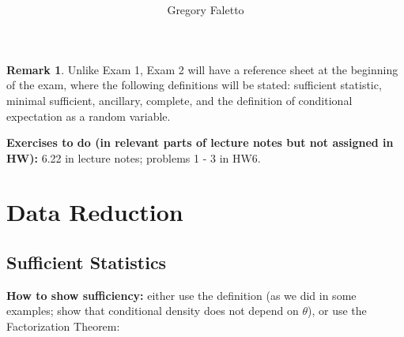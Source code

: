 \documentclass{article}
\title{
    \vspace{2in}
    \textmd{\textbf{ \hmwkTitle}}\\
}
\author{Gregory Faletto}
\date{}
\theoremstyle{definition}
\newtheorem{theorem}{Theorem}
\theoremstyle{definition}
\theoremstyle{definition}
\theoremstyle{definition}
\theoremstyle{definition}
\newtheorem*{remark}{Remark}
\theoremstyle{definition}
\theoremstyle{definition}
\begin{document}
\maketitle

\pagebreak


%
%



\newpage
%

\begin{remark}Unlike Exam 1, Exam 2 will have a reference sheet at the beginning of the exam, where the following definitions will be stated: sufficient statistic, minimal sufficient, ancillary, complete, and the definition of conditional expectation as a random variable.

\end{remark}

\textbf{Exercises to do (in relevant parts of lecture notes but not assigned in HW):} 6.22 in lecture notes; problems 1 - 3 in HW6.

\section{Data Reduction}

\subsection{Sufficient Statistics}

\textbf{How to show sufficiency:} either use the definition (as we did in some examples; show that conditional density does not depend on \(\theta\)), or use the Factorization Theorem:

\noindent{}
\end{document}
